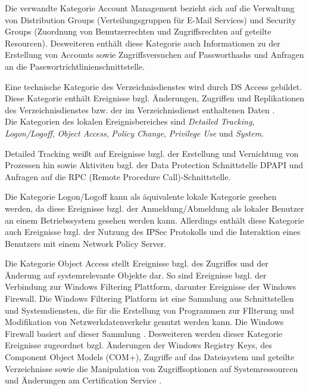 Die verwandte Kategorie \glqq Account Management\grqq{}  bezieht sich auf die Verwaltung von Distribution Groups (Verteilungsgruppen für E-Mail Services) und Security Groups (Zuordnung von Benutzerrechten und Zugriffsrechten auf geteilte Resourcen). Desweiteren enthält diese Kategorie auch Informationen zu der Erstellung von Accounts sowie Zugriffsversuchen auf Passworthashs und Anfragen an die Passwortrichtlinienschnittstelle. 

Eine technische Kategorie des Verzeichnisdienstes wird durch \glqq DS Access\grqq{}  gebildet. Diese Kategorie enthält Ereignisse bzgl. Änderungen, Zugriffen und Replikationen des Verzeichnisdienstes bzw. der im Verzeichnisdienst enthaltenen Daten \citep{MS3}. \\

Die Kategorien des lokalen Ereignisbereiches sind \textit{Detailed Tracking}, \textit{Logon/Logoff}, \textit{Object Access}, \textit{Policy Change}, \textit{Privilege Use} und \textit{System}.

\glqq Detailed Tracking\grqq{}  weißt auf Ereignisse bzgl. der Erstellung und Vernichtung von Prozessen hin sowie Aktiviten bzgl. der Data Protection Schnittstelle \glqq DPAPI\grqq{}  und Anfragen auf die RPC (Remote Procedure Call)-Schnittstelle.

Die Kategorie \glqq Logon/Logoff\grqq{} kann als äquivalente lokale Kategorie gesehen werden, da diese Ereignisse bzgl. der Anmeldung/Abmeldung als lokaler Benutzer an einem Betriebssystem gesehen werden kann. Allerdings enthält diese Kategorie auch Ereignisse bzgl. der Nutzung des IPSec Protokolls und die Interaktion eines Benutzers mit einem Network Policy Server. 

Die Kategorie \glqq Object Access\grqq{} stellt Ereignisse bzgl. des Zugriffes und der Änderung auf systemrelevante Objekte dar. So sind Ereignisse bzgl. der Verbindung zur Windows Filtering Plattform, darunter Ereignisse der Windows Firewall. Die Windows Filtering Platform ist eine Sammlung aus Schnittstellen und Systemdiensten, die für die Erstellung von Programmen zur FIlterung und Modifikation von Netzwerkdatenverkehr genutzt werden kann. Die Windows Firewall basiert auf dieser Sammlung \citep{MS4}. 
Desweiteren werden dieser Kategorie Ereignisse zugeordnet bzgl. Änderungen der Windows Registry Keys, des Component Object Models (COM+), Zugriffe auf das Dateisystem und geteilte Verzeichnisse sowie die Manipulation von Zugriffsoptionen auf Systemressourcen und Änderungen am Certification Service \citep{MS3}. 

